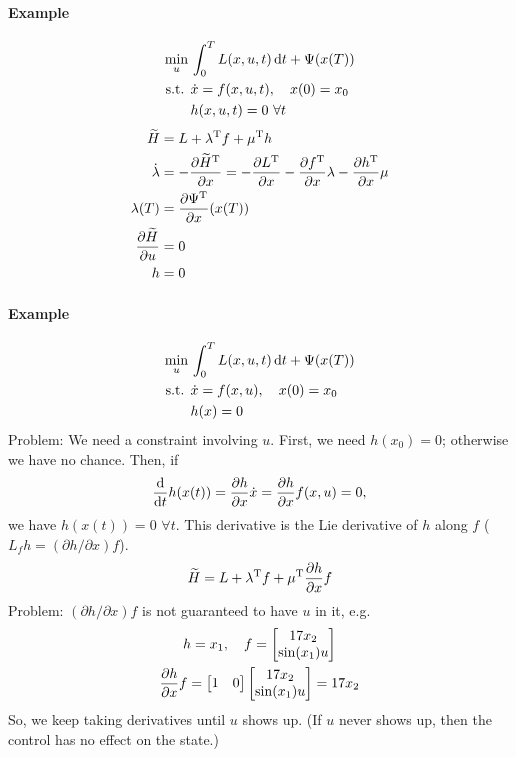 \paragraph{Example} \mbox{}
\begin{align}
  \min_u {} & \int_0^T L(x,u,t)\mathop{}\!\mathrm{d} t + \Psi(x(T)) \\
  \text{s.t. } & \dot x = f(x,u,t), \quad x(0)=x_0 \\
            & h(x,u,t) = 0\ \forall t
\end{align}
\begin{align}
  \widetilde H &= L + \lambda^\text{T} f + \mu^\text{T} h \\
  \dot\lambda &= -\frac{\partial \widetilde H^\text{T}}{\partial x} = -\frac{\partial L^\text{T}}{\partial x} - \frac{\partial f^\text{T}}{\partial x}\lambda - \frac{\partial h^\text{T}}{\partial x}\mu \\
  \lambda(T) &= \frac{\partial \Psi^\text{T}}{\partial x}(x(T)) \\
  \frac{\partial \widetilde H}{\partial u} &= 0 \\
  h &= 0
\end{align}

\paragraph{Example} \mbox{}
\begin{align}
  \min_u {} & \int_0^T L(x,u,t)\mathop{}\!\mathrm{d} t + \Psi(x(T)) \\
  \text{s.t. } & \dot x = f(x,u), \quad x(0)=x_0 \\
            & h(x) = 0
\end{align}
Problem: We need a constraint involving $u$. First, we need $h(x_0)=0$; otherwise we have no chance. Then, if
\begin{gather}
  \frac{\mathop{}\!\mathrm{d}}{\mathop{}\!\mathrm{d} t} h(x(t)) = \frac{\partial h}{\partial x} \dot x = \frac{\partial h}{\partial x} f(x,u) = 0,
\end{gather}
we have $h(x(t))=0$ $\forall t$. This derivative is the Lie derivative of $h$ along $f$ ($L_f h=(\partial h/\partial x)f$).
\begin{gather}
  \widetilde H = L + \lambda^\text{T} f + \mu^\text{T} \frac{\partial h}{\partial x} f
\end{gather}
Problem: $(\partial h/\partial x)f$ is not guaranteed to have $u$ in it, e.g.
\begin{gather}
  h = x_1, \quad f=\begin{bmatrix}
    17 x_2 \\ \sin(x_1) u
  \end{bmatrix} \\
  \frac{\partial h}{\partial x} f = \begin{bmatrix}
    1 & 0
  \end{bmatrix}
  \begin{bmatrix}
    17 x_2 \\ \sin(x_1) u
  \end{bmatrix}
  = 17 x_2
\end{gather}
So, we keep taking derivatives until $u$ shows up. (If $u$ never shows up, then the control has no effect on the state.)

